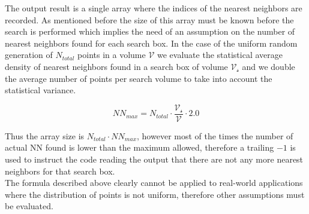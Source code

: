 The output result is a single array where the indices of the nearest neighbors are recorded. As mentioned before the size of this array must be known before the search is performed which implies the need of an assumption on the number of nearest neighbors found for each search box. In the case of the uniform random generation of $N_{total}$ points in a volume $\mathcal{V}$ we evaluate the statistical average density of nearest neighbors found in a search box of volume $\mathcal{V_s}$ and we double the average number of points per search volume to take into account the statistical variance.
\begin{center}
\begin{equation}
N\!N_{max} =  N_{total} \cdot \dfrac{\mathcal{V_s}}{\mathcal{V}} \cdot 2.0
\end{equation}
\end{center}

Thus the array size is $N_{total} \cdot N\!N_{max}$, however most of the times the number of actual NN found is lower than the maximum allowed, therefore a trailing $-1$ is used to instruct the code reading the output that there are not any more nearest neighbors for that search box.\\
The formula described above clearly cannot be applied to real-world applications where the distribution of points is not uniform, therefore other assumptions must be evaluated.\\

